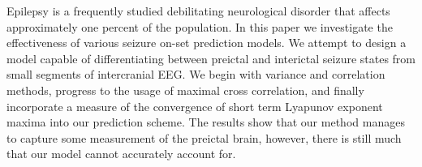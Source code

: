Epilepsy is a frequently studied debilitating neurological disorder that affects approximately one percent of the population.  In this paper we investigate the effectiveness of various seizure on-set prediction models.  We attempt to design a model capable of differentiating between preictal and interictal seizure states from small segments of intercranial EEG.  We begin with variance and correlation methods, progress to the usage of maximal cross correlation, and finally incorporate a measure of the convergence of short term Lyapunov exponent maxima into our prediction scheme.  The results show that our method manages to capture some measurement of the preictal brain, however, there is still much that our model cannot accurately account for.
